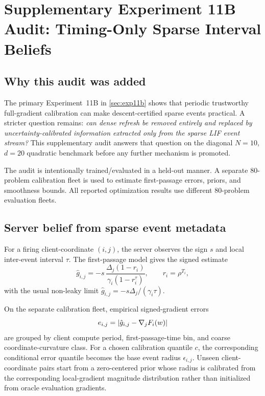 \section{Supplementary Experiment 11B Audit: Timing-Only Sparse Interval Beliefs}
\label{sec:exp11b-sparse-interval}

\subsection{Why this audit was added}

The primary Experiment~11B in \cref{sec:exp11b} shows that periodic trustworthy full-gradient calibration can make descent-certified sparse events practical. A stricter question remains: \emph{can dense refresh be removed entirely and replaced by uncertainty-calibrated information extracted only from the sparse LIF event stream?} This supplementary audit answers that question on the diagonal $N=10$, $d=20$ quadratic benchmark before any further mechanism is promoted.

The audit is intentionally trained/evaluated in a held-out manner. A separate 80-problem calibration fleet is used to estimate first-passage errors, priors, and smoothness bounds. All reported optimization results use different 80-problem evaluation fleets.

\subsection{Server belief from sparse event metadata}

For a firing client-coordinate $(i,j)$, the server observes the sign $s$ and local inter-event interval $\tau$. The first-passage model gives the signed estimate
\begin{equation}
  \hat g_{i,j}
  =-s\,\frac{\Delta_j(1-r_i)}{\gamma_i(1-r_i^\tau)},
  \qquad r_i=\rho^{T_i},
\end{equation}
with the usual non-leaky limit $\hat g_{i,j}=-s\Delta_j/(\gamma_i\tau)$.

On the separate calibration fleet, empirical signed-gradient errors
\begin{equation}
  e_{i,j}=\left|\hat g_{i,j}-\nabla_jF_i(w)\right|
\end{equation}
are grouped by client compute period, first-passage-time bin, and coarse coordinate-curvature class. For a chosen calibration quantile $c$, the corresponding conditional error quantile becomes the base event radius $\epsilon_{i,j}$. Unseen client-coordinate pairs start from a zero-centered prior whose radius is calibrated from the corresponding local-gradient magnitude distribution rather than initialized from oracle evaluation gradients.

